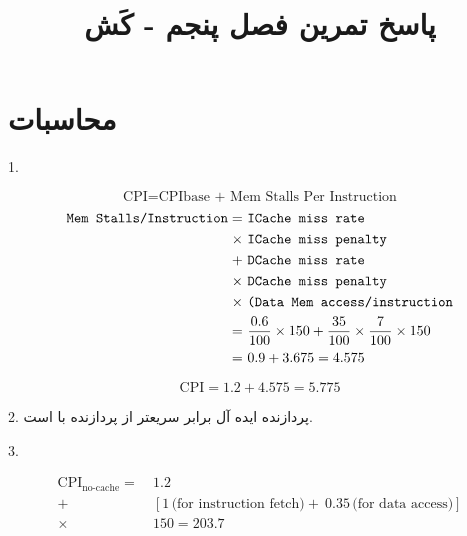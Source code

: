 \documentclass[11pt, dvipsnames, svgnames, x11names]{article}
\title{پاسخ تمرین فصل پنجم - کَش}
\date{}
\begin{document}
\maketitle    
\tableofcontents

\section{}
\begin{flushleft}
\end{flushleft}

\section{محاسبات}
1. 
\begin{latin}
\begin{equation}
\text{CPI} = \text{CPIbase + Mem Stalls Per Instruction}
\end{equation}
\begin{equation}
\begin{split}
\text{\texttt{Mem Stalls/Instruction}} = 
& \ \text{\texttt{ICache miss rate}} \\
\times & \ \text{\texttt{ICache miss penalty}} \\
+ & \ \text{\texttt{DCache miss rate}} \\
\times & \ \text{\texttt{DCache miss penalty}} \\
\times & \ \text{\texttt{(Data Mem access/instruction}} \\
= & \ \frac{0.6}{100} \times 150 + \frac{35}{100} \times \frac{7}{100}  \times 150 \\
= & \ 0.9 + 3.675 = 4.575 \\
\end{split}
\end{equation}

\begin{equation}
\text{CPI} = 1.2 + 4.575 = 5.775
\end{equation}
\end{latin}

2. 
پردازنده ایده آل
برابر سریعتر از پردازنده با  است.

\vspace{5mm}
3. 
\begin{latin}
\begin{equation}
\begin{split}
\text{CPI}_{\text{no-cache}} = & \ 1.2 \\
+ & \ [1 \, \text{(for instruction fetch)} 
+ \ 0.35 \, \text{(for data access)}] \\ 
\times & \ 150 = 203.7 
\end{split}
\end{equation}
\end{latin}
\end{document}
